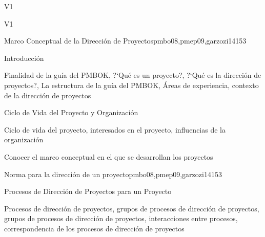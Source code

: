 \begin{syllabus}
\begin{outcomes}{V1}
\item {}
\item {}
\item {}
\end{outcomes}

\begin{specificoutcomes}{V1}
    \item {}
    \item {}
    \item {}
    \item {}
\end{specificoutcomes}

\begin{unit}{Marco Conceptual de la Dirección de Proyectos}{}{pmbo08,pmep09,garzozi14}{15}{3}
\begin{topics}
      \item Introducción
      \item Finalidad de la guía del PMBOK, ?`Qué es un proyecto?, ?`Qué es la dirección de proyectos?, La estructura de la guía del PMBOK, Áreas de experiencia, contexto de la dirección de proyectos
      \item Ciclo de Vida del Proyecto y Organización
      \item Ciclo de vida del proyecto, interesados en el proyecto, influencias de la organización
\end{topics}

\begin{learningoutcomes}
      \item Conocer el marco conceptual en el que se desarrollan los proyectos
\end{learningoutcomes}
\end{unit}

\begin{unit}{Norma para la dirección de un proyecto}{}{pmbo08,pmep09,garzozi14}{15}{3}
\begin{topics}
      \item Procesos de Dirección de Proyectos para un Proyecto
      \item Procesos de dirección de proyectos, grupos de procesos de dirección de proyectos, grupos de procesos de dirección de proyectos, interacciones entre procesos, correspondencia de los procesos de dirección de proyectos
\end{topics}


\end{unit}
\end{syllabus}

